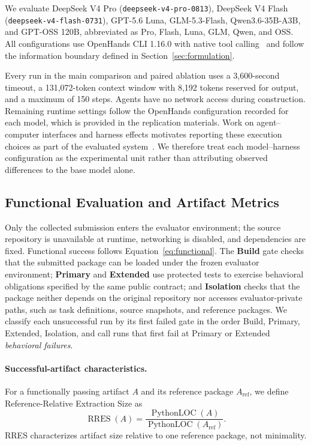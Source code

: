 \documentclass[acmsmall,screen,review,anonymous]{acmart}
\begin{document}
We evaluate DeepSeek V4 Pro (\texttt{deepseek-v4-\allowbreak pro-0813}), DeepSeek V4 Flash
(\texttt{deepseek-v4-\allowbreak flash-0731}), GPT-5.6 Luna, GLM-5.3-Flash,
Qwen3.6-35B-A3B, and GPT-OSS 120B, abbreviated as Pro, Flash, Luna, GLM,
Qwen, and OSS. All configurations use OpenHands CLI 1.16.0 with native tool
calling~\cite{wang2025openhands} and follow the information boundary defined in
Section~\ref{sec:formulation}.

Every run in the main comparison and paired ablation uses a 3,600-second timeout,
a 131,072-token context window with 8,192 tokens reserved for output, and a
maximum of 150 steps. Agents have no network access during construction.
Remaining runtime settings follow the OpenHands configuration recorded for each
model, which is provided in the replication materials. Work on
agent--computer interfaces and harness
effects motivates reporting these execution choices as part of the evaluated
system~\cite{yang2024sweagent,yao2026harnessbench}. We therefore treat each
model--harness configuration as the experimental unit rather than attributing
observed differences to the base model alone.

\subsection{Functional Evaluation and Artifact Metrics}
\label{sec:functional-eval}

Only the collected submission enters the evaluator environment; the source
repository is unavailable at runtime, networking is disabled, and dependencies
are fixed. Functional success follows Equation~\ref{eq:functional}. The
\textbf{Build} gate checks that the submitted package can be loaded under the
frozen evaluator environment; \textbf{Primary} and \textbf{Extended} use protected
tests to exercise behavioral obligations specified by the same public contract; and
\textbf{Isolation} checks that the package neither depends on the original
repository nor accesses evaluator-private paths, such as task definitions,
source snapshots, and reference packages. We classify each unsuccessful run by its first failed gate in the order
Build, Primary, Extended, Isolation, and call runs that first fail at Primary or
Extended \emph{behavioral failures}.

\paragraph{Successful-artifact characteristics.}
For a functionally passing artifact $A$ and its reference package
$A_{\mathrm{ref}}$, we define Reference-Relative Extraction Size as
\begin{equation}
  \operatorname{RRES}(A)=
  \frac{\operatorname{PythonLOC}(A)}
       {\operatorname{PythonLOC}(A_{\mathrm{ref}})}.
  \label{eq:rres}
\end{equation}
RRES characterizes artifact size relative to one reference package, not
minimality.
\end{document}
